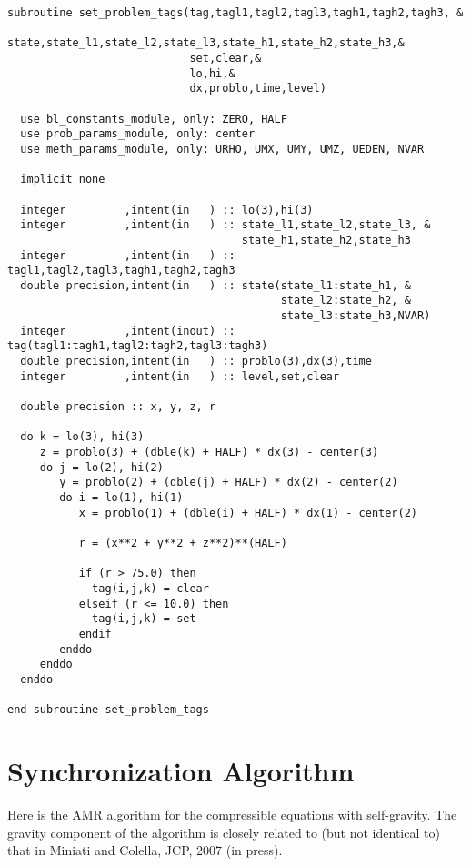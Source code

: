 \begin{verbatim}
subroutine set_problem_tags(tag,tagl1,tagl2,tagl3,tagh1,tagh2,tagh3, &
                            state,state_l1,state_l2,state_l3,state_h1,state_h2,state_h3,&
                            set,clear,&
                            lo,hi,&
                            dx,problo,time,level)

  use bl_constants_module, only: ZERO, HALF
  use prob_params_module, only: center
  use meth_params_module, only: URHO, UMX, UMY, UMZ, UEDEN, NVAR
 
  implicit none
  
  integer         ,intent(in   ) :: lo(3),hi(3)
  integer         ,intent(in   ) :: state_l1,state_l2,state_l3, &
                                    state_h1,state_h2,state_h3
  integer         ,intent(in   ) :: tagl1,tagl2,tagl3,tagh1,tagh2,tagh3
  double precision,intent(in   ) :: state(state_l1:state_h1, &
                                          state_l2:state_h2, &
                                          state_l3:state_h3,NVAR)
  integer         ,intent(inout) :: tag(tagl1:tagh1,tagl2:tagh2,tagl3:tagh3)
  double precision,intent(in   ) :: problo(3),dx(3),time
  integer         ,intent(in   ) :: level,set,clear

  double precision :: x, y, z, r

  do k = lo(3), hi(3)
     z = problo(3) + (dble(k) + HALF) * dx(3) - center(3)
     do j = lo(2), hi(2)
        y = problo(2) + (dble(j) + HALF) * dx(2) - center(2)
        do i = lo(1), hi(1)
           x = problo(1) + (dble(i) + HALF) * dx(1) - center(2)

           r = (x**2 + y**2 + z**2)**(HALF)

           if (r > 75.0) then
             tag(i,j,k) = clear
           elseif (r <= 10.0) then
             tag(i,j,k) = set
           endif
        enddo
     enddo
  enddo
  
end subroutine set_problem_tags
\end{verbatim}

\section{Synchronization Algorithm}

Here is the AMR algorithm for the compressible equations with
self-gravity.  The gravity component of the algorithm 
is closely related to (but not identical to) that in Miniati and Colella,
JCP, 2007 (in press).


